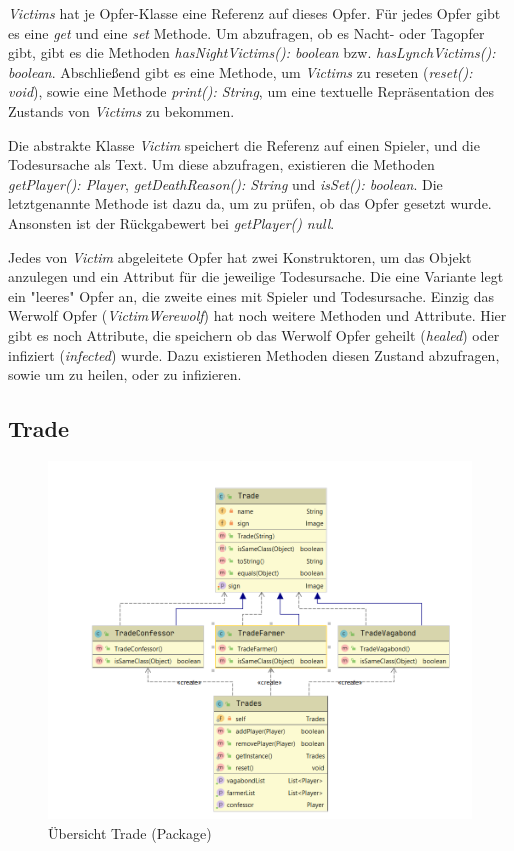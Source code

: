 \medskip
\textit{Victims} hat je Opfer-Klasse eine Referenz auf dieses Opfer. 
Für jedes Opfer gibt es eine \textit{get} und eine \textit{set} Methode. 
Um abzufragen, ob es Nacht- oder Tagopfer gibt, gibt es die Methoden \textit{hasNightVictims(): boolean} bzw. \textit{hasLynchVictims(): boolean}. 
Abschließend gibt es eine Methode, um \textit{Victims} zu reseten (\textit{reset(): void}), sowie eine Methode \textit{print(): String}, um eine textuelle Repräsentation des Zustands von \textit{Victims} zu bekommen. 

\medskip
Die abstrakte Klasse \textit{Victim} speichert die Referenz auf einen Spieler, und die Todesursache als Text. 
Um diese abzufragen, existieren die Methoden \textit{getPlayer(): Player}, \textit{getDeathReason(): String} und \textit{isSet(): boolean}. Die letztgenannte Methode ist dazu da, um zu prüfen, ob das Opfer gesetzt wurde. Ansonsten ist der Rückgabewert bei \textit{getPlayer()} \textit{null}. 

\medskip
Jedes von \textit{Victim} abgeleitete Opfer hat zwei Konstruktoren, um das Objekt anzulegen und ein Attribut für die jeweilige Todesursache. Die eine Variante legt ein "leeres" Opfer an, die zweite eines mit Spieler und Todesursache. 
Einzig das Werwolf Opfer (\textit{VictimWerewolf}) hat noch weitere Methoden und Attribute. 
Hier gibt es noch Attribute, die speichern ob das Werwolf Opfer geheilt (\textit{healed}) oder infiziert (\textit{infected}) wurde. Dazu existieren Methoden diesen Zustand abzufragen, sowie um zu heilen, oder zu infizieren. 

\subsection{Trade}
\begin{figure}[H]
	\centering
	\includegraphics[width=\textwidth]{architektur/Trade_Uebersicht.png}
	\caption{Übersicht Trade (Package)}
	\label{figure:trade_uebersicht}
\end{figure}

